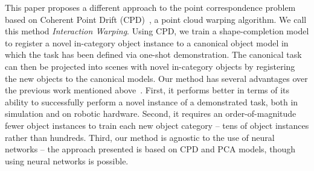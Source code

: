 \documentclass{article}
\newcommand{\evdp}[1]{\textcolor{blue}{[\textbf{EvdP:} #1]}}
\begin{document}


This paper proposes a different approach to the point correspondence problem based on Coherent Point Drift (CPD)~\cite{myronenko2010point},
a point cloud warping algorithm.
We call this method \emph{Interaction Warping}. Using CPD, we train a shape-completion model to register a novel in-category object instance to a canonical object model in which the task has been defined via one-shot demonstration. The canonical task can then be projected into scenes with novel in-category objects by registering the new objects to the canonical models. Our method has several advantages over the previous work mentioned above~\cite{pan2022tax,wang2019dynamic,manuelli2019kpam}. First, it performs better in terms of its ability to successfully perform a novel instance of a demonstrated task, both in simulation and on robotic hardware. Second, it requires an order-of-magnitude fewer object instances to train each new object category -- tens of object instances rather than hundreds.
Third, our method is agnostic to the use of neural networks -- the approach presented is based on CPD and PCA models, though using neural networks is possible.%

\end{document}
